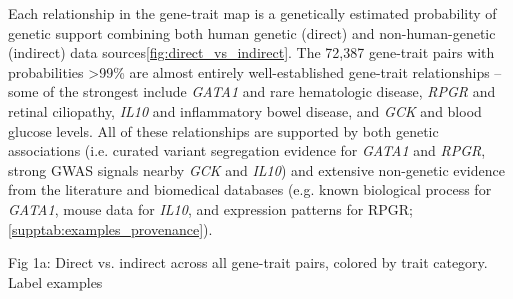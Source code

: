 \documentclass[sn-nature,lineno]{sn-jnl}%
\theoremstyle{thmstyleone}%
\theoremstyle{thmstyletwo}%
\theoremstyle{thmstylethree}%
\begin{document}

Each relationship in the gene-trait map is a genetically estimated probability of genetic support combining both human genetic (direct) and non-human-genetic (indirect) data sources\ref{fig:direct_vs_indirect}. The 72,387 gene-trait pairs with probabilities >99\% are almost entirely well-established gene-trait relationships -- some of the strongest include \textit{GATA1} and rare hematologic disease, \textit{RPGR} and retinal ciliopathy, \textit{IL10} and inflammatory bowel disease, and {\it GCK} and blood glucose levels. All of these relationships are supported by both genetic associations (i.e. curated variant segregation evidence for \textit{GATA1} and \textit{RPGR}, strong GWAS signals nearby \textit{GCK} and \textit{IL10}) and extensive non-genetic evidence from the literature and biomedical databases (e.g. known biological process for \textit{GATA1}, mouse data for \textit{IL10}, and expression patterns for RPGR; \ref{supptab:examples_provenance}). 

Fig 1a: Direct vs. indirect across all gene-trait pairs, colored by trait category. Label examples 

\end{document}
